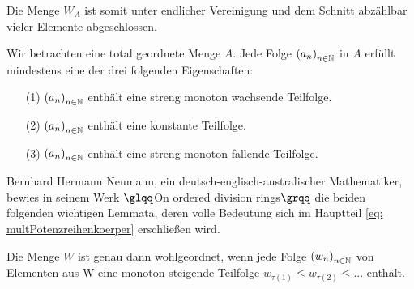 %
%
%
%
% 
%
%
%
%
Die Menge $W_A$ ist somit unter endlicher Vereinigung und dem Schnitt abzählbar vieler Elemente abgeschlossen.
\begin{lemma}\label{unendlicheFolgeEigenschaften}
Wir betrachten eine total geordnete Menge $A$. Jede Folge $\left(a_n\right)_{n \in \mathbb{N}}$ in $A$ erfüllt mindestens eine der drei folgenden Eigenschaften:
\begin{enumerate}
\item[(1)] $\left(a_n\right)_{n \in \mathbb{N}}$ enthält eine streng monoton wachsende Teilfolge.
\item[(2)] $\left(a_n\right)_{n \in \mathbb{N}}$ enthält eine konstante Teilfolge.
\item[(3)] $\left(a_n\right)_{n \in \mathbb{N}}$ enthält eine streng monoton fallende Teilfolge.
\end{enumerate}
%
\end{lemma}
%
Bernhard Hermann Neumann, ein deutsch-englisch-australischer Mathematiker, bewies in seinem Werk $\glqq$On ordered division rings$\grqq$ \cite[S. 206]{neumann49} die beiden folgenden wichtigen Lemmata, deren volle Bedeutung sich im Hauptteil \ref{eq: multPotenzreihenkoerper} erschließen wird. 
\begin{lemma}\label{wohlgeordnetwennkeineabfallendeFolge} %
Die Menge $W$ ist genau dann wohlgeordnet, wenn jede Folge $\left(w_n\right)_{n\in\mathbb{N}}$ von Elementen aus W eine monoton steigende Teilfolge  $w_{\tau(1)} \le w_{\tau(2)} \le ...$ enthält.
\end{lemma}

